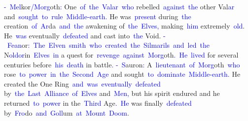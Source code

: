 \documentclass{article}
\begin{document}
\begin{tcolorbox}[colframe=black,colback=white]
{}\textcolor{blue}{-}\textcolor{blue}{~Mel}kor\textcolor{blue}{/M}\textcolor{blue}{org}oth\textcolor{blue}{:} One\textcolor{blue}{~of}\textcolor{blue}{~the}\textcolor{blue}{~Val}\textcolor{blue}{ar}\textcolor{blue}{~who} rebelled\textcolor{blue}{~against}\textcolor{blue}{~the} other Val\textcolor{blue}{ar} and\textcolor{blue}{~sought}\textcolor{blue}{~to}\textcolor{blue}{~rule}\textcolor{blue}{~Middle}\textcolor{blue}{-earth}\textcolor{blue}{.} He was\textcolor{blue}{~present} during\textcolor{blue}{~the} creation\textcolor{blue}{~of}\textcolor{blue}{~Ar}da\textcolor{blue}{~and}\textcolor{blue}{~the} awakening of\textcolor{blue}{~the}\textcolor{blue}{~Elves}\textcolor{blue}{,} making\textcolor{blue}{~him} extremely\textcolor{blue}{~old}. He\textcolor{blue}{~was} eventually\textcolor{blue}{~defeated} and cast into\textcolor{blue}{~the} Void.
\textcolor{blue}{-}\textcolor{blue}{~Fe}\textcolor{blue}{an}or\textcolor{blue}{:}\textcolor{blue}{~The}\textcolor{blue}{~El}\textcolor{blue}{ven}\textcolor{blue}{~smith}\textcolor{blue}{~who}\textcolor{blue}{~created}\textcolor{blue}{~the}\textcolor{blue}{~Sil}\textcolor{blue}{mar}\textcolor{blue}{ils}\textcolor{blue}{~and}\textcolor{blue}{~led}\textcolor{blue}{~the} N\textcolor{blue}{old}\textcolor{blue}{or}in\textcolor{blue}{~Elves}\textcolor{blue}{~in} a quest for\textcolor{blue}{~revenge}\textcolor{blue}{~against}\textcolor{blue}{~Morg}oth\textcolor{blue}{.}\textcolor{blue}{~He}\textcolor{blue}{~lived} for several centuries before\textcolor{blue}{~his}\textcolor{blue}{~death} in battle\textcolor{blue}{.
}\textcolor{blue}{-}\textcolor{blue}{~S}auron\textcolor{blue}{:} A\textcolor{blue}{~lieutenant}\textcolor{blue}{~of}\textcolor{blue}{~Morg}oth\textcolor{blue}{~who} rose\textcolor{blue}{~to}\textcolor{blue}{~power}\textcolor{blue}{~in}\textcolor{blue}{~the}\textcolor{blue}{~Second}\textcolor{blue}{~Age} and sought\textcolor{blue}{~to}\textcolor{blue}{~dominate}\textcolor{blue}{~Middle}\textcolor{blue}{-earth}\textcolor{blue}{.} He created the One Ring\textcolor{blue}{~and}\textcolor{blue}{~was}\textcolor{blue}{~eventually}\textcolor{blue}{~defeated} by\textcolor{blue}{~the}\textcolor{blue}{~Last}\textcolor{blue}{~Alliance}\textcolor{blue}{~of}\textcolor{blue}{~Elves} and\textcolor{blue}{~Men}\textcolor{blue}{,} but his spirit endured and he returned\textcolor{blue}{~to}\textcolor{blue}{~power} in the\textcolor{blue}{~Third} Age\textcolor{blue}{.}\textcolor{blue}{~He} was finally\textcolor{blue}{~defeated} by\textcolor{blue}{~Fro}do\textcolor{blue}{~and}\textcolor{blue}{~G}\textcolor{blue}{oll}um\textcolor{blue}{~at}\textcolor{blue}{~Mount}\textcolor{blue}{~Doom}.

\end{tcolorbox}
\end{document}
